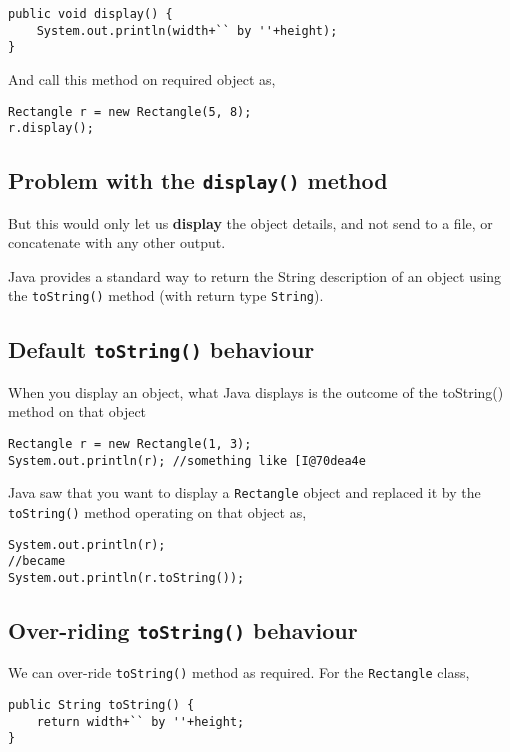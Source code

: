 \begin{lstlisting}
public void display() {
    System.out.println(width+`` by ''+height);
}
\end{lstlisting}

And call this method on required object as,

\begin{lstlisting}
Rectangle r = new Rectangle(5, 8);
r.display();
\end{lstlisting}

\subsection{Problem with the \texttt{display()} method}

But this would only let us \textbf{display} the object details, and not send to a file, or concatenate with any other output. 

Java provides a standard way to return the String description of an object using the \texttt{toString()} method (with return type \texttt{String}). 

\subsection{Default \texttt{toString()} behaviour}

When you display an object, what Java displays is the outcome of the {toString()} method on that object
\begin{lstlisting}
Rectangle r = new Rectangle(1, 3);
System.out.println(r); //something like [I@70dea4e
\end{lstlisting}

Java saw that you want to display a \texttt{Rectangle} object and replaced it by the \texttt{toString()} method operating on that object as,

\begin{lstlisting}
System.out.println(r);
//became
System.out.println(r.toString()); 
\end{lstlisting}

\subsection{Over-riding \texttt{toString()} behaviour}

We can over-ride \texttt{toString()} method as required. For the \texttt{Rectangle} class,

\begin{lstlisting}
public String toString() {
    return width+`` by ''+height;
}
\end{lstlisting}

